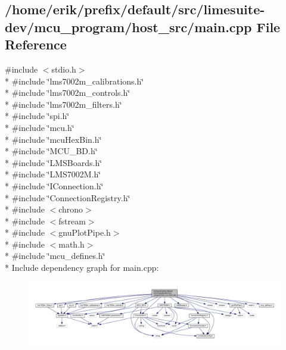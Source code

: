 \subsection{/home/erik/prefix/default/src/limesuite-\/dev/mcu\+\_\+program/host\+\_\+src/main.cpp File Reference}
\label{mcu__program_2host__src_2main_8cpp}
{\ttfamily \#include $<$stdio.\+h$>$}\\*
{\ttfamily \#include \char`\"{}lms7002m\+\_\+calibrations.\+h\char`\"{}}\\*
{\ttfamily \#include \char`\"{}lms7002m\+\_\+controls.\+h\char`\"{}}\\*
{\ttfamily \#include \char`\"{}lms7002m\+\_\+filters.\+h\char`\"{}}\\*
{\ttfamily \#include \char`\"{}spi.\+h\char`\"{}}\\*
{\ttfamily \#include \char`\"{}mcu.\+h\char`\"{}}\\*
{\ttfamily \#include \char`\"{}mcu\+Hex\+Bin.\+h\char`\"{}}\\*
{\ttfamily \#include \char`\"{}M\+C\+U\+\_\+\+B\+D.\+h\char`\"{}}\\*
{\ttfamily \#include \char`\"{}L\+M\+S\+Boards.\+h\char`\"{}}\\*
{\ttfamily \#include \char`\"{}L\+M\+S7002\+M.\+h\char`\"{}}\\*
{\ttfamily \#include \char`\"{}I\+Connection.\+h\char`\"{}}\\*
{\ttfamily \#include \char`\"{}Connection\+Registry.\+h\char`\"{}}\\*
{\ttfamily \#include $<$chrono$>$}\\*
{\ttfamily \#include $<$fstream$>$}\\*
{\ttfamily \#include $<$gnu\+Plot\+Pipe.\+h$>$}\\*
{\ttfamily \#include $<$math.\+h$>$}\\*
{\ttfamily \#include \char`\"{}mcu\+\_\+defines.\+h\char`\"{}}\\*
Include dependency graph for main.\+cpp\+:
\nopagebreak
\begin{figure}[H]
\begin{center}
\leavevmode
\includegraphics[width=350pt]{d2/de8/mcu__program_2host__src_2main_8cpp__incl}
\end{center}
\end{figure}
